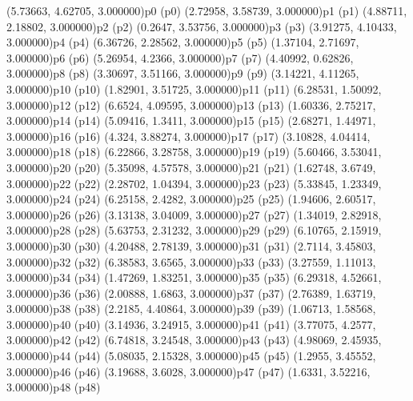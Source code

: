 \psPoint(5.73663, 4.62705, 3.000000){p0}
\psdot(p0)
\psPoint(2.72958, 3.58739, 3.000000){p1}
\psdot(p1)
\psPoint(4.88711, 2.18802, 3.000000){p2}
\psdot(p2)
\psPoint(0.2647, 3.53756, 3.000000){p3}
\psdot(p3)
\psPoint(3.91275, 4.10433, 3.000000){p4}
\psdot(p4)
\psPoint(6.36726, 2.28562, 3.000000){p5}
\psdot(p5)
\psPoint(1.37104, 2.71697, 3.000000){p6}
\psdot(p6)
\psPoint(5.26954, 4.2366, 3.000000){p7}
\psdot(p7)
\psPoint(4.40992, 0.62826, 3.000000){p8}
\psdot(p8)
\psPoint(3.30697, 3.51166, 3.000000){p9}
\psdot(p9)
\psPoint(3.14221, 4.11265, 3.000000){p10}
\psdot(p10)
\psPoint(1.82901, 3.51725, 3.000000){p11}
\psdot(p11)
\psPoint(6.28531, 1.50092, 3.000000){p12}
\psdot(p12)
\psPoint(6.6524, 4.09595, 3.000000){p13}
\psdot(p13)
\psPoint(1.60336, 2.75217, 3.000000){p14}
\psdot(p14)
\psPoint(5.09416, 1.3411, 3.000000){p15}
\psdot(p15)
\psPoint(2.68271, 1.44971, 3.000000){p16}
\psdot(p16)
\psPoint(4.324, 3.88274, 3.000000){p17}
\psdot(p17)
\psPoint(3.10828, 4.04414, 3.000000){p18}
\psdot(p18)
\psPoint(6.22866, 3.28758, 3.000000){p19}
\psdot(p19)
\psPoint(5.60466, 3.53041, 3.000000){p20}
\psdot(p20)
\psPoint(5.35098, 4.57578, 3.000000){p21}
\psdot(p21)
\psPoint(1.62748, 3.6749, 3.000000){p22}
\psdot(p22)
\psPoint(2.28702, 1.04394, 3.000000){p23}
\psdot(p23)
\psPoint(5.33845, 1.23349, 3.000000){p24}
\psdot(p24)
\psPoint(6.25158, 2.4282, 3.000000){p25}
\psdot(p25)
\psPoint(1.94606, 2.60517, 3.000000){p26}
\psdot(p26)
\psPoint(3.13138, 3.04009, 3.000000){p27}
\psdot(p27)
\psPoint(1.34019, 2.82918, 3.000000){p28}
\psdot(p28)
\psPoint(5.63753, 2.31232, 3.000000){p29}
\psdot(p29)
\psPoint(6.10765, 2.15919, 3.000000){p30}
\psdot(p30)
\psPoint(4.20488, 2.78139, 3.000000){p31}
\psdot(p31)
\psPoint(2.7114, 3.45803, 3.000000){p32}
\psdot(p32)
\psPoint(6.38583, 3.6565, 3.000000){p33}
\psdot(p33)
\psPoint(3.27559, 1.11013, 3.000000){p34}
\psdot(p34)
\psPoint(1.47269, 1.83251, 3.000000){p35}
\psdot(p35)
\psPoint(6.29318, 4.52661, 3.000000){p36}
\psdot(p36)
\psPoint(2.00888, 1.6863, 3.000000){p37}
\psdot(p37)
\psPoint(2.76389, 1.63719, 3.000000){p38}
\psdot(p38)
\psPoint(2.2185, 4.40864, 3.000000){p39}
\psdot(p39)
\psPoint(1.06713, 1.58568, 3.000000){p40}
\psdot(p40)
\psPoint(3.14936, 3.24915, 3.000000){p41}
\psdot(p41)
\psPoint(3.77075, 4.2577, 3.000000){p42}
\psdot(p42)
\psPoint(6.74818, 3.24548, 3.000000){p43}
\psdot(p43)
\psPoint(4.98069, 2.45935, 3.000000){p44}
\psdot(p44)
\psPoint(5.08035, 2.15328, 3.000000){p45}
\psdot(p45)
\psPoint(1.2955, 3.45552, 3.000000){p46}
\psdot(p46)
\psPoint(3.19688, 3.6028, 3.000000){p47}
\psdot(p47)
\psPoint(1.6331, 3.52216, 3.000000){p48}
\psdot(p48)

